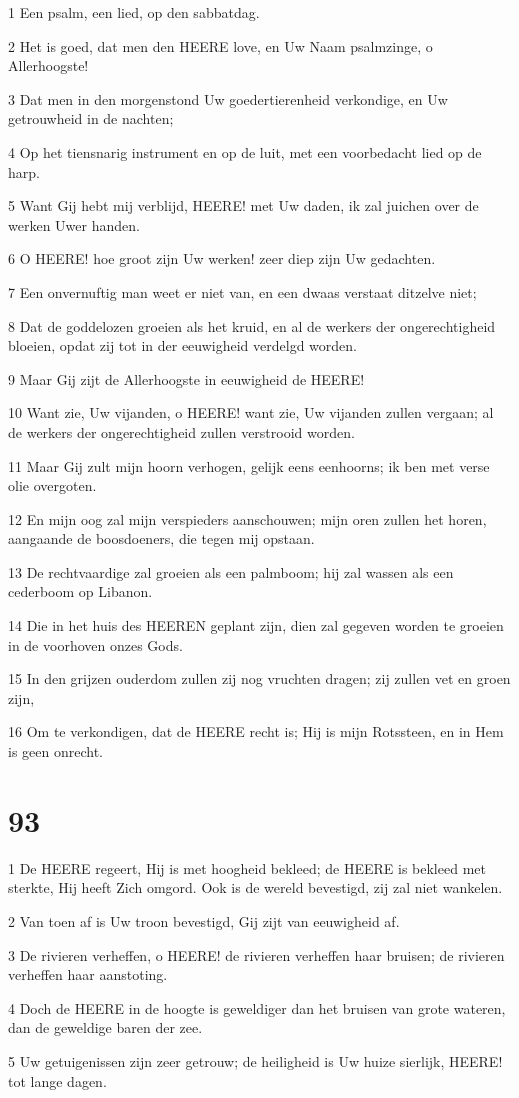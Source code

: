 \par 1 Een psalm, een lied, op den sabbatdag.
\par 2 Het is goed, dat men den HEERE love, en Uw Naam psalmzinge, o Allerhoogste!
\par 3 Dat men in den morgenstond Uw goedertierenheid verkondige, en Uw getrouwheid in de nachten;
\par 4 Op het tiensnarig instrument en op de luit, met een voorbedacht lied op de harp.
\par 5 Want Gij hebt mij verblijd, HEERE! met Uw daden, ik zal juichen over de werken Uwer handen.
\par 6 O HEERE! hoe groot zijn Uw werken! zeer diep zijn Uw gedachten.
\par 7 Een onvernuftig man weet er niet van, en een dwaas verstaat ditzelve niet;
\par 8 Dat de goddelozen groeien als het kruid, en al de werkers der ongerechtigheid bloeien, opdat zij tot in der eeuwigheid verdelgd worden.
\par 9 Maar Gij zijt de Allerhoogste in eeuwigheid de HEERE!
\par 10 Want zie, Uw vijanden, o HEERE! want zie, Uw vijanden zullen vergaan; al de werkers der ongerechtigheid zullen verstrooid worden.
\par 11 Maar Gij zult mijn hoorn verhogen, gelijk eens eenhoorns; ik ben met verse olie overgoten.
\par 12 En mijn oog zal mijn verspieders aanschouwen; mijn oren zullen het horen, aangaande de boosdoeners, die tegen mij opstaan.
\par 13 De rechtvaardige zal groeien als een palmboom; hij zal wassen als een cederboom op Libanon.
\par 14 Die in het huis des HEEREN geplant zijn, dien zal gegeven worden te groeien in de voorhoven onzes Gods.
\par 15 In den grijzen ouderdom zullen zij nog vruchten dragen; zij zullen vet en groen zijn,
\par 16 Om te verkondigen, dat de HEERE recht is; Hij is mijn Rotssteen, en in Hem is geen onrecht.

\chapter{93}

\par 1 De HEERE regeert, Hij is met hoogheid bekleed; de HEERE is bekleed met sterkte, Hij heeft Zich omgord. Ook is de wereld bevestigd, zij zal niet wankelen.
\par 2 Van toen af is Uw troon bevestigd, Gij zijt van eeuwigheid af.
\par 3 De rivieren verheffen, o HEERE! de rivieren verheffen haar bruisen; de rivieren verheffen haar aanstoting.
\par 4 Doch de HEERE in de hoogte is geweldiger dan het bruisen van grote wateren, dan de geweldige baren der zee.
\par 5 Uw getuigenissen zijn zeer getrouw; de heiligheid is Uw huize sierlijk, HEERE! tot lange dagen.

